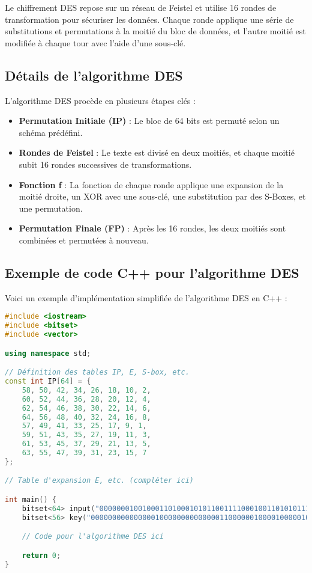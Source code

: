\documentclass[12pt,a4paper]{article}
\begin{document}
Le chiffrement DES repose sur un réseau de Feistel et utilise 16 rondes de transformation pour sécuriser les données. Chaque ronde applique une série de substitutions et permutations à la moitié du bloc de données, et l'autre moitié est modifiée à chaque tour avec l'aide d'une sous-clé.

\subsection{Détails de l'algorithme DES}
L'algorithme DES procède en plusieurs étapes clés :

\begin{itemize}
    \item \textbf{Permutation Initiale (IP)} : Le bloc de 64 bits est permuté selon un schéma prédéfini.
    \item \textbf{Rondes de Feistel} : Le texte est divisé en deux moitiés, et chaque moitié subit 16 rondes successives de transformations.
    \item \textbf{Fonction f} : La fonction de chaque ronde applique une expansion de la moitié droite, un XOR avec une sous-clé, une substitution par des S-Boxes, et une permutation.
    \item \textbf{Permutation Finale (FP)} : Après les 16 rondes, les deux moitiés sont combinées et permutées à nouveau.
\end{itemize}

\subsection{Exemple de code C++ pour l'algorithme DES}
Voici un exemple d'implémentation simplifiée de l'algorithme DES en C++ :

\begin{lstlisting}[language=C++]
#include <iostream>
#include <bitset>
#include <vector>

using namespace std;

// Définition des tables IP, E, S-box, etc.
const int IP[64] = {
    58, 50, 42, 34, 26, 18, 10, 2,
    60, 52, 44, 36, 28, 20, 12, 4,
    62, 54, 46, 38, 30, 22, 14, 6,
    64, 56, 48, 40, 32, 24, 16, 8,
    57, 49, 41, 33, 25, 17, 9, 1,
    59, 51, 43, 35, 27, 19, 11, 3,
    61, 53, 45, 37, 29, 21, 13, 5,
    63, 55, 47, 39, 31, 23, 15, 7
};

// Table d'expansion E, etc. (compléter ici)

int main() {
    bitset<64> input("0000000100100011010001010110011110001001101010111100111111100001");
    bitset<56> key("0000000000000001000000000000001100000010000100000100000000000000");

    // Code pour l'algorithme DES ici

    return 0;
}
\end{lstlisting}
\end{document}
